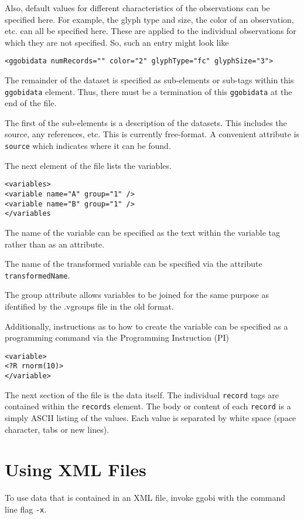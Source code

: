 \documentclass{article}
\begin{document}
Also, default values for different characteristics of the observations
can be specified here.  For example, the glyph type and size, the
color of an observation, etc. can all be specified here.  These are
applied to the individual observations for which they are not
specified.  So, such an entry might look like
\begin{verbatim}
<ggobidata numRecords="" color="2" glyphType="fc" glyphSize="3">
\end{verbatim}
The remainder of the dataset is specified as sub-elements or sub-tags
within this \texttt{ggobidata} element.  Thus, there must be a
termination of this \texttt{ggobidata} at the end of the file.

The first of the sub-elements is a description of the datasets.  This
includes the source, any references, etc.  This is currently
free-format.  A convenient attribute is \texttt{source} which
indicates where it can be found.

The next element of the file 
lists the variables.
\begin{verbatim}
<variables>
<variable name="A" group="1" />
<variable name="B" group="1" />
</variables
\end{verbatim}
The name of the variable
can be specified as the text within the
variable tag rather than as an attribute.

The name of the transformed variable can be specified via the
attribute \texttt{transformedName}.

The group attribute allows variables to be joined for the same purpose
as ifentified by the .vgroups file in the old format.

Additionally, instructions as to how to create the variable can be
specified as a programming command via the Programming Instruction
(PI)
\begin{verbatim}
<variable>
<?R rnorm(10)>
</variable>
\end{verbatim}

The next section of the file is the data itself.  The individual
\texttt{record} tags are contained within the \texttt{records}
element.  The body or content of each \texttt{record} is a simply
ASCII listing of the values. Each value is separated
by white space (space character, tabs or new lines).


\section{Using XML Files}
To use data that is contained in an XML file, 
invoke ggobi with the command line flag
\texttt{-x}.
\end{document}
